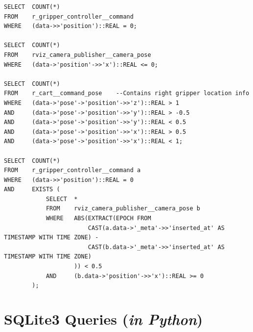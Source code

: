 \documentclass[nocopyrightspace]{acm_proc_article-sp}
\begin{document}
\begin{lstlisting}[style=sql]
SELECT 	COUNT(*) 
FROM 	r_gripper_controller__command 
WHERE 	(data->>'position')::REAL = 0;

SELECT	COUNT(*)
FROM	rviz_camera_publisher__camera_pose
WHERE	(data->'position'->>'x')::REAL <= 0;

SELECT	COUNT(*)
FROM    r_cart__command_pose    --Contains right gripper location info
WHERE   (data->'pose'->'position'->>'z')::REAL > 1
AND     (data->'pose'->'position'->>'y')::REAL > -0.5
AND     (data->'pose'->'position'->>'y')::REAL < 0.5
AND     (data->'pose'->'position'->>'x')::REAL > 0.5
AND     (data->'pose'->'position'->>'x')::REAL < 1;

SELECT	COUNT(*)
FROM	r_gripper_controller__command a
WHERE	(data->>'position')::REAL = 0
AND     EXISTS (
            SELECT  *
            FROM    rviz_camera_publisher__camera_pose b
            WHERE   ABS(EXTRACT(EPOCH FROM 
                        CAST(a.data->'_meta'->>'inserted_at' AS TIMESTAMP WITH TIME ZONE) - 
                        CAST(b.data->'_meta'->>'inserted_at' AS TIMESTAMP WITH TIME ZONE)
                    )) < 0.5
            AND     (b.data->'position'->>'x')::REAL >= 0
        );
\end{lstlisting}

\section{SQLite3 Queries (\textit{in Python})}
\vspace{0.5cm}
\end{document}
